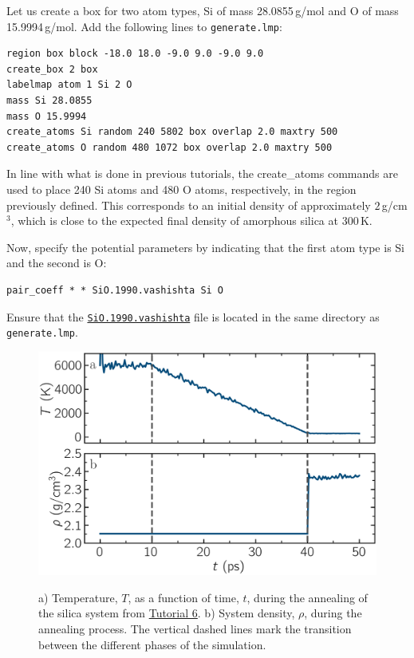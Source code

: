 \documentclass[9pt,tutorial]{livecoms}
\newcommand{\lmpcmd}[1]{\colorbox{listing}{\textcolor{command}{\small{#1}}}} %
\newcommand{\flecmd}[1]{\textcolor{command}{\texttt{#1}}} %
\newcommand{\dwlcmd}[1]{\textcolor{download}{\texttt{#1}}} %
\newcommand{\filepath}{https://raw.githubusercontent.com/lammpstutorials/lammpstutorials-article/main/files/}
\begin{document}
Let us create a box for two atom types, \lmpcmd{Si}
of mass 28.0855\,g/mol and \lmpcmd{O} of mass 15.9994\,g/mol.
Add the following lines to \flecmd{generate.lmp}:
\begin{lstlisting}
region box block -18.0 18.0 -9.0 9.0 -9.0 9.0
create_box 2 box
labelmap atom 1 Si 2 O
mass Si 28.0855
mass O 15.9994
create_atoms Si random 240 5802 box overlap 2.0 maxtry 500
create_atoms O random 480 1072 box overlap 2.0 maxtry 500
\end{lstlisting}
In line with what is done in previous tutorials, the
\lmpcmd{create\_atoms} commands are used to place
240 Si atoms and 480 O atoms, respectively, in the region previously defined.  This corresponds to
an initial density of approximately $2$\,g/cm$^3$, which is close
to the expected final density of amorphous silica at 300\,K.

Now, specify the potential parameters by indicating that the first atom type
is \lmpcmd{Si} and the second is \lmpcmd{O}:
\begin{lstlisting}
pair_coeff * * SiO.1990.vashishta Si O
\end{lstlisting}
Ensure that the \href{\filepath tutorial6/SiO.1990.vashishta}{\dwlcmd{SiO.1990.vashishta}}
file is located in the same directory as \flecmd{generate.lmp}.

\begin{figure}
\centering
\includegraphics[width=\linewidth]{GCMC-dimension}\\[-2ex]
\caption{a) Temperature, $T$, as a function of time, $t$, during the annealing
of the silica system from \hyperref[gcmc-silica-label]{Tutorial 6}.
b) System density, $\rho$, during the annealing process.  The vertical dashed lines
mark the transition between the different phases of the simulation.}
\label{fig:GCMC-dimension}
\end{figure}
\end{document}
